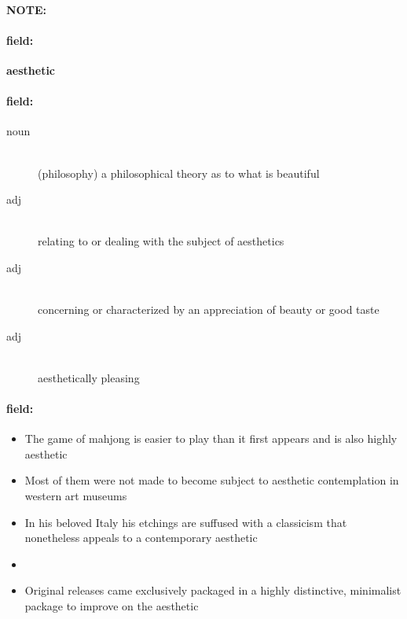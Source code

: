 \documentclass[12pt]{article}
\newenvironment{note}{\paragraph{NOTE:}}{}
\newenvironment{field}{\paragraph{field:}}{}
\begin{document}
\begin{note}
\begin{field}
\textbf{\large aesthetic}
\end{field}


\begin{field}
\begin{description}
\item[noun] \hfill \\ 
(philosophy) a philosophical theory as to what is beautiful

\item[adj] \hfill \\ 
relating to or dealing with the subject of aesthetics

\item[adj] \hfill \\ 
concerning or characterized by an appreciation of beauty or good taste

\item[adj] \hfill \\ 
aesthetically pleasing

\end{description}
\end{field}

\begin{field}
\begin{itemize}
\item The game of mahjong is easier to play than it first appears and is also highly aesthetic
\item Most of them were not made to become subject to aesthetic contemplation in western art museums
\item In his beloved Italy his etchings are suffused with a classicism that nonetheless appeals to a contemporary aesthetic
\item 
\item Original releases came exclusively packaged in a highly distinctive, minimalist package to improve on the aesthetic
\end{itemize}
\end{field}
\end{note}
\end{document}
